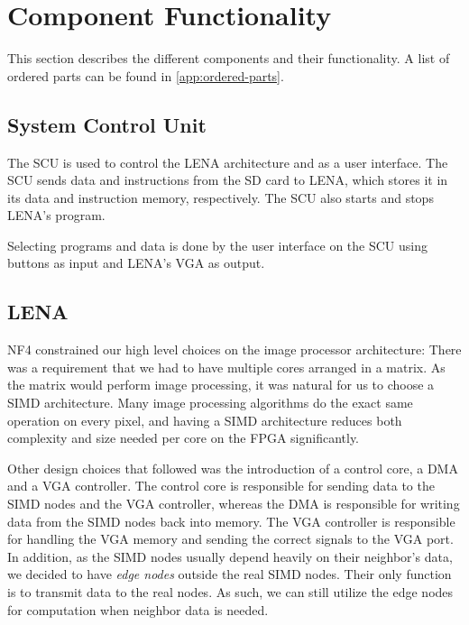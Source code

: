 \section{Component Functionality}

This section describes the different components and their functionality. A list
of ordered parts can be found in \ref{app:ordered-parts}.

\subsection{System Control Unit}

The \ac{SCU} is used to control the \ac{LENA} architecture and as a user
interface. The SCU sends data and instructions from the \ac{SD} card to
\ac{LENA}, which stores it in its data and instruction memory,
respectively. The \ac{SCU} also starts and stops \ac{LENA}'s program.

Selecting programs and data is done by the user interface on the \ac{SCU} using
buttons as input and \ac{LENA}'s VGA as output.

\subsection{LENA}

NF4 constrained our high level choices on the image processor architecture:
There was a requirement that we had to have multiple cores arranged in a
matrix. As the matrix would perform image processing, it was natural for us to
choose a \ac{SIMD} architecture. Many image processing algorithms do the exact
same operation on every pixel, and having a \ac{SIMD} architecture reduces both
complexity and size needed per core on the \ac{FPGA} significantly.

Other design choices that followed was the introduction of a control core, a
\ac{DMA} and a \ac{VGA} controller. The control core is responsible for sending
data to the \ac{SIMD} nodes and the \ac{VGA} controller, whereas the \ac{DMA} is
responsible for writing data from the \ac{SIMD} nodes back into memory. The
\ac{VGA} controller is responsible for handling the \ac{VGA} memory and sending
the correct signals to the \ac{VGA} port. In addition, as the \ac{SIMD} nodes
usually depend heavily on their neighbor's data, we decided to have \emph{edge nodes} outside the real \ac{SIMD} nodes. Their only function is to transmit
data to the real nodes. As such, we can still utilize the edge nodes for
computation when neighbor data is needed.
